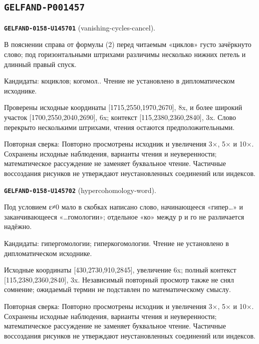 \subsection*{\texttt{GELFAND-P001457}}
\par\noindent\leavevmode{}\label{GELFAND-0158-U145701}\label{GELFAND-P001457:vanishing-cycles-cancel}\textbf{\texttt{GELFAND-0158-U145701}} (vanishing-cycles-cancel).\nopagebreak[4]\par
В пояснении справа от формулы (2) перед читаемым «циклов» густо зачёркнуто слово; под горизонтальными штрихами различимы несколько нижних петель и длинный правый спуск.\par
Кандидаты: коциклов; когомол.. Чтение не установлено в дипломатическом исходнике.\par
Проверены исходные координаты [1715,2550,1970,2670], 8x, и более широкий участок [1700,2550,2040,2690], 6x; контекст [115,2380,2360,2840], 3x. Слово перекрыто несколькими штрихами, чтения остаются предположительными.\par
Повторная сверка: Повторно просмотрены исходник и увеличения 3×, 5× и 10×. Сохранены исходные наблюдения, варианты чтения и неуверенности; математическое рассуждение не заменяет буквальное чтение. Частичные воссоздания рисунков не утверждают неустановленных соединений или индексов.\par\medskip
\par\noindent\leavevmode{}\label{GELFAND-0158-U145702}\label{GELFAND-P001457:hypercohomology-word}\textbf{\texttt{GELFAND-0158-U145702}} (hypercohomology-word).\nopagebreak[4]\par
Под условием ε≠0 мало в скобках написано слово, начинающееся «гипер…» и заканчивающееся «…гомологии»; отдельное «ко» между р и го не различается надёжно.\par
Кандидаты: гипергомологии; гиперкогомологии. Чтение не установлено в дипломатическом исходнике.\par
Исходные координаты [430,2730,910,2845], увеличение 6x; полный контекст [115,2380,2360,2840], 3x. Независимый повторный просмотр также не снял сомнение; ожидаемый термин не подставлен по математическому смыслу.\par
Повторная сверка: Повторно просмотрены исходник и увеличения 3×, 5× и 10×. Сохранены исходные наблюдения, варианты чтения и неуверенности; математическое рассуждение не заменяет буквальное чтение. Частичные воссоздания рисунков не утверждают неустановленных соединений или индексов.\par\medskip
